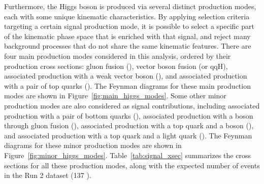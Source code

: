 Furthermore, the Higgs boson is produced via several distinct production modes, each with some unique kinematic characteristics. 
By applying selection criteria targeting a certain signal production mode, it is possible to select a specific part of the kinematic phase space that is enriched with that signal, 
and reject many background processes that do not share the same kinematic features. 
There are four main production modes considered in this analysis, ordered by their production cross sections: gluon fusion (\ggH), vector boson fusion (\qqH or qqH), 
associated production with a weak vector boson (\VH), and associated production with a pair of top quarks (\ttH). 
The Feynman diagrams for these main production modes are shown in Figure~\ref{fig:main_higgs_modes}.
Some other minor production modes are also considered as signal contributions, including associated production with a pair of bottom quarks (\bbH),
associated production with a \PZ boson through gluon fusion (\ggZH), associated production with a top quark and a \PW boson (\tHW), 
and associated production with a top quark and a light quark (\tHq). 
The Feynman diagrams for these minor production modes are shown in Figure~\ref{fig:minor_higgs_modes}.
Table~\ref{tab:signal_xsec} summarizes the cross sections for all these production modes, 
along with the expected number of events in the Run 2 dataset (137 \invfb).

